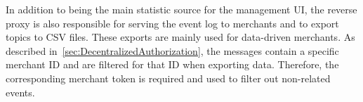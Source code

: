 In addition to being the main statistic source for the management UI, the reverse proxy is also responsible for serving the event log to merchants and to export topics to CSV files. These exports are mainly used for data-driven merchants. As described in~\ref{sec:DecentralizedAuthorization}, the messages contain a specific merchant ID and are filtered for that ID when exporting data. Therefore, the corresponding merchant token is required and used to filter out non-related events.


%
%

